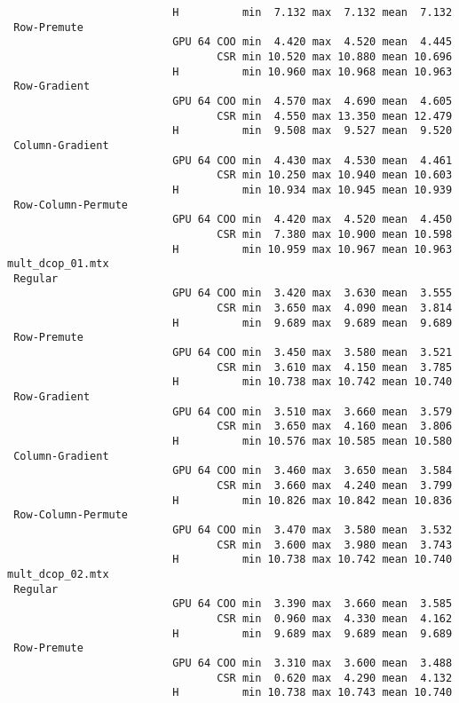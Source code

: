 {\begin{verbatim}
                          H          min  7.132 max  7.132 mean  7.132
 Row-Premute
                          GPU 64 COO min  4.420 max  4.520 mean  4.445
                                 CSR min 10.520 max 10.880 mean 10.696
                          H          min 10.960 max 10.968 mean 10.963
 Row-Gradient
                          GPU 64 COO min  4.570 max  4.690 mean  4.605
                                 CSR min  4.550 max 13.350 mean 12.479
                          H          min  9.508 max  9.527 mean  9.520
 Column-Gradient
                          GPU 64 COO min  4.430 max  4.530 mean  4.461
                                 CSR min 10.250 max 10.940 mean 10.603
                          H          min 10.934 max 10.945 mean 10.939
 Row-Column-Permute
                          GPU 64 COO min  4.420 max  4.520 mean  4.450
                                 CSR min  7.380 max 10.900 mean 10.598
                          H          min 10.959 max 10.967 mean 10.963
mult_dcop_01.mtx
 Regular
                          GPU 64 COO min  3.420 max  3.630 mean  3.555
                                 CSR min  3.650 max  4.090 mean  3.814
                          H          min  9.689 max  9.689 mean  9.689
 Row-Premute
                          GPU 64 COO min  3.450 max  3.580 mean  3.521
                                 CSR min  3.610 max  4.150 mean  3.785
                          H          min 10.738 max 10.742 mean 10.740
 Row-Gradient
                          GPU 64 COO min  3.510 max  3.660 mean  3.579
                                 CSR min  3.650 max  4.160 mean  3.806
                          H          min 10.576 max 10.585 mean 10.580
 Column-Gradient
                          GPU 64 COO min  3.460 max  3.650 mean  3.584
                                 CSR min  3.660 max  4.240 mean  3.799
                          H          min 10.826 max 10.842 mean 10.836
 Row-Column-Permute
                          GPU 64 COO min  3.470 max  3.580 mean  3.532
                                 CSR min  3.600 max  3.980 mean  3.743
                          H          min 10.738 max 10.742 mean 10.740
mult_dcop_02.mtx
 Regular
                          GPU 64 COO min  3.390 max  3.660 mean  3.585
                                 CSR min  0.960 max  4.330 mean  4.162
                          H          min  9.689 max  9.689 mean  9.689
 Row-Premute
                          GPU 64 COO min  3.310 max  3.600 mean  3.488
                                 CSR min  0.620 max  4.290 mean  4.132
                          H          min 10.738 max 10.743 mean 10.740

\end{verbatim}}
